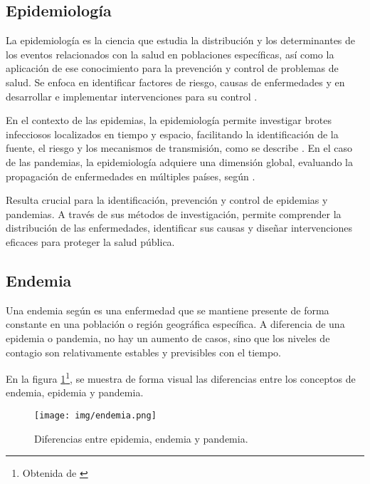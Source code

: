 \begin{enumerate}
\subsection{Epidemiología}
La epidemiología es la ciencia que estudia la distribución y los determinantes de los eventos relacionados con la salud en poblaciones específicas, así como la aplicación de ese conocimiento para la prevención y control de problemas de salud. Se enfoca en identificar factores de riesgo, causas de enfermedades y en desarrollar e implementar intervenciones para su control \cite{hajat2010introduction}.

En el contexto de las epidemias, la epidemiología permite investigar brotes infecciosos localizados en tiempo y espacio, facilitando la identificación de la fuente, el riesgo y los mecanismos de transmisión, como se describe \cite{riley2019differentiating}. En el caso de las pandemias, la epidemiología adquiere una dimensión global, evaluando la propagación de enfermedades en múltiples países, según \cite{piret2021pandemics}. 

Resulta crucial para la identificación, prevención y control de epidemias y pandemias. A través de sus métodos de investigación, permite comprender la distribución de las enfermedades, identificar sus causas y diseñar intervenciones eficaces para proteger la salud pública.

\subsection{Endemia}
Una endemia según \cite{ranm_endemia} es una enfermedad que se mantiene presente de forma constante en una población o región geográfica específica. A diferencia de una epidemia o pandemia, no hay un aumento de casos, sino que los niveles de contagio son relativamente estables y previsibles con el tiempo.

En la figura \ref{fig:difernecias}\footnote{Obtenida de \cite{rie2020covid}}, se muestra de forma visual las diferencias entre los conceptos de endemia, epidemia y pandemia.


\begin{figure}[H]
        \centering
        \texttt{[image: img/endemia.png]}
        \caption{Diferencias entre epidemia, endemia y pandemia.}
        \label{fig:difernecias}
        \vspace{0.5cm} %
    \end{figure}



\end{enumerate}
